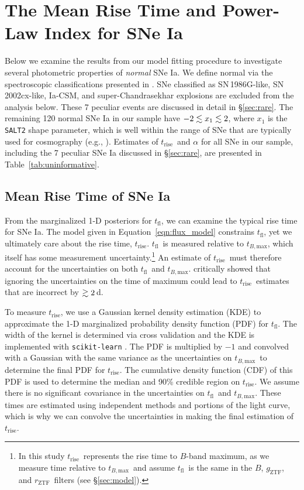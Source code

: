 \documentclass[twocolumn]{aastex63}
\newcommand{\rztf}{$r_\mathrm{ZTF}$}
\newcommand{\gztf}{$g_\mathrm{ZTF}$}
\newcommand{\tfl}{$t_\mathrm{fl}$}
\newcommand{\trise}{$t_\mathrm{rise}$}
\newcommand{\tbmax}{$t_{B,\mathrm{max}}$}
\begin{document}
\section{The Mean Rise Time and Power-Law Index for SNe
Ia}\label{sec:mean_parameters}

Below we examine the results from our model fitting procedure to investigate
several photometric properties of \textit{normal} SNe Ia. We define normal via
the spectroscopic classifications presented in \citet{Yao19}. SNe classified
as SN\,1986G-like, SN\,2002cx-like, Ia-CSM, and super-Chandrasekhar explosions
are excluded from the analysis below. These 7 peculiar events are discussed in
detail in \S\ref{sec:rare}. The remaining 120 normal SNe Ia in our sample
have $-2 \lesssim x_1 \lesssim 2$, where $x_1$ is the \texttt{SALT2} shape parameter,
which is well within the range of SNe that are typically used for cosmography
(e.g., \citealt{Scolnic18a}). Estimates of \trise\ and $\alpha$ for all SNe in
our sample, including the 7 peculiar SNe Ia discussed in \S\ref{sec:rare}, are
presented in Table~\ref{tab:uninformative}.

\subsection{Mean Rise Time of SNe Ia}\label{sec:mean_rise}

From the marginalized 1-D posteriors for \tfl, we can examine the typical rise
time for SNe Ia. The model given in Equation~\ref{eqn:flux_model} constrains
\tfl, yet we ultimately care about the rise time, \trise. \tfl\ is measured
relative to \tbmax, which itself has some measurement uncertainty.\footnote{In
this study \trise\ represents the rise time to $B$-band maximum, as we measure
time relative to \tbmax\ and assume \tfl\ is the same in the $B$, \gztf, and
\rztf\ filters (see \S\ref{sec:model}).} An estimate of \trise\ must therefore
account for the uncertainties on both \tfl\ and \tbmax. \citet{Aldering00}
critically showed that ignoring the uncertainties on the time of maximum could
lead to \trise\ estimates that are incorrect by $\gtrsim 2$\,d.

To measure \trise, we use a Gaussian kernel density estimation (KDE) to
approximate the 1-D marginalized probability density function (PDF) for \tfl.
The width of the kernel is determined via cross validation and the KDE is
implemented with \texttt{scikit-learn} \citep{Pedregosa11}. The PDF is
multiplied by $-1$ and convolved with a Gaussian with the same variance as the
uncertainties on \tbmax\ to determine the final PDF for \trise. The cumulative
density function (CDF) of this PDF is used to determine the median and 90\%
credible region on \trise. We assume there is no significant covariance in the
uncertainties on \tfl\ and \tbmax. These times are estimated using independent
methods and portions of the light curve, which is why we can convolve the
uncertainties in making the final estimation of \trise.
\end{document}
